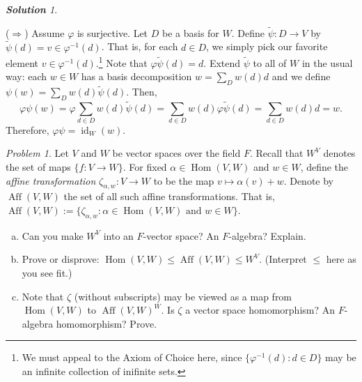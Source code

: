 \documentclass[11pt]{paper}
\theoremstyle{remark}
\newtheorem{problem}{Problem}
\newtheorem*{solution}{{\bf Solution}}
\newcommand\0{\ensuremath{\mathbf{0}}}
\newcommand{\<}{\ensuremath{\langle}}
\renewcommand{\>}{\ensuremath{\rangle}}
\newcommand\Hom{\ensuremath{\operatorname{Hom}}}
\newcommand{\Aff}{\ensuremath{\operatorname{Aff}}}
\newcommand{\id}{\ensuremath{\operatorname{id}}}
\renewcommand{\phi}{\ensuremath{\varphi}}
\renewcommand{\leq}{\ensuremath{\leqslant}}
\begin{document}
\begin{solution}
\begin{enumerate}[(a)]
($\Rightarrow$) Assume $\phi$ is surjective.  Let $D$ be a basis for
    $W$.  Define $\tilde{\psi}: D\rightarrow V$ by $\tilde{\psi}(d) = v \in
    \phi^{-1}(d)$.  That is, for each $d \in D$, we simply pick our favorite
    element $v\in \phi^{-1}(d)$.\footnote{We
    must appeal to the Axiom of Choice here, since $\{\phi^{-1}(d) : d \in D\}$
    may be an infinite collection of inifinite sets.} Note that 
    $\phi\tilde{\psi}(d) = d$.  Extend $\tilde{\psi}$ to all of $W$ in the usual
    way: each $w\in W$ has a basis decomposition $w = \sum_D w(d) d$ and we
    define $\psi(w) = \sum_D w(d) \tilde{\psi}(d)$.  Then,
\[
\phi\psi(w) = \phi \sum_{d\in D} w(d) \tilde{\psi}(d)
=\sum_{d\in D} w(d)  \phi \tilde{\psi}(d)
=\sum_{d\in D} w(d)  d = w.
\]
Therefore, $ \phi \psi = \id_W(w)$.

  \end{enumerate}

\end{solution}

\probskip

\begin{problem}  %
Let $V$ and $W$ be vector spaces over the field $F$.
Recall that $W^V$ denotes the set of maps $\{f : V \rightarrow W\}$.
For fixed $\alpha \in \Hom(V,W)$ and $w \in W$, define the 
\emph{affine transformation} $\zeta_{\alpha, w}: V \rightarrow W$ to be the map 
$v \mapsto \alpha(v) + w$.
Denote by $\Aff (V, W)$ the set of all such affine transformations.  That is,
$\Aff (V, W) := \{\zeta_{\alpha, w} : \alpha \in \Hom(V,W) \text{ and } w \in W\}$.
\begin{enumerate}[(a)]
\item Can you make $W^V$ into an $F$-vector space? An $F$-algebra? Explain.
\item Prove or disprove: $\Hom(V,W) \leq \Aff (V, W) \leq W^{V}$. 
(Interpret $\leq$ here as you see fit.)
\item Note that $\zeta$ (without subscripts) may be viewed as a map from 
$\Hom(V,W)$ to $\Aff(V,W)^W$. Is $\zeta$ a vector space
  homomorphism?  An $F$-algebra homomorphism? Prove.
\end{enumerate}

\end{problem}

\probskip
\end{document}

